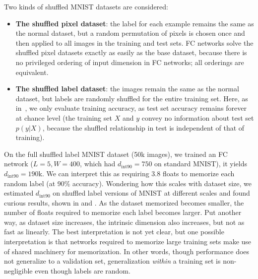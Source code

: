 \documentclass{article} %
\newcommand{\dintn}{d_{\mathrm{int90}}}
\begin{document}
Two kinds of shuffled MNIST datasets are considered:

\begin{itemize}
\item 
  {\bf The shuffled pixel dataset}: the label for each example remains the same as the normal dataset, but a random permutation of pixels is chosen once and then applied to all images in the training and test sets. FC networks solve the shuffled pixel datasets exactly as easily as the base dataset, because there is no privileged ordering of input dimension in FC networks; all orderings are equivalent.
\item 
  {\bf The shuffled label dataset}: the images remain the same as the normal dataset, but labels are randomly shuffled for the entire training set. Here, as in~\citep{zhang2016understanding}, we only evaluate training accuracy, as test set accuracy remains forever at chance level (the training set $X$ and $y$ convey no information about test set $p(y|X)$, because the shuffled relationship in test is independent of that of training).		
\end{itemize}


On the full shuffled label MNIST dataset (50k images), we trained an FC network ($L=5, W=400$,  which had $\dintn=750$ on standard MNIST), it yields $\dintn = 190$k.
We can interpret this as requiring 3.8 floats to memorize each random label (at 90\% accuracy).
%
Wondering how this scales with dataset size, we estimated $\dintn$ on shuffled label versions of MNIST at different scales and found curious results, shown in  and .
As the dataset memorized becomes smaller, the number of floats required to memorize each label becomes larger.
Put another way, as dataset size increases, the intrinsic dimension also increases, but not as fast as linearly.
%
The best interpretation is not yet clear, but one possible interpretation is that networks required to memorize large training sets make use of shared machinery for memorization. In other words, though performance does not generalize to a validation set, generalization \emph{within} a training set is non-negligible even though labels are random.
\end{document}
